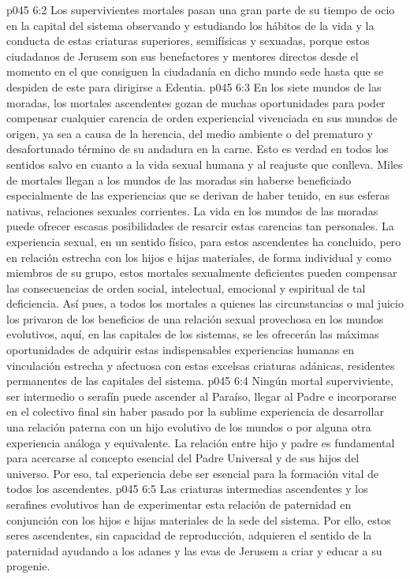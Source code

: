\vs p045 6:2 Los supervivientes mortales pasan una gran parte de su tiempo de ocio en la capital del sistema observando y estudiando los hábitos de la vida y la conducta de estas criaturas superiores, semifísicas y sexuadas, porque estos ciudadanos de Jerusem son sus benefactores y mentores directos desde el momento en el que consiguen la ciudadanía en dicho mundo sede hasta que se despiden de este para dirigirse a Edentia.
\vs p045 6:3 En los siete mundos de las moradas, los mortales ascendentes gozan de muchas oportunidades para poder compensar cualquier carencia de orden experiencial vivenciada en sus mundos de origen, ya sea a causa de la herencia, del medio ambiente o del prematuro y desafortunado término de su andadura en la carne. Esto es verdad en todos los sentidos salvo en cuanto a la vida sexual humana y al reajuste que conlleva. Miles de mortales llegan a los mundos de las moradas sin haberse beneficiado especialmente de las experiencias que se derivan de haber tenido, en sus esferas nativas, relaciones sexuales corrientes. La vida en los mundos de las moradas puede ofrecer escasas posibilidades de resarcir estas carencias tan personales. La experiencia sexual, en un sentido físico, para estos ascendentes ha concluido, pero en relación estrecha con los hijos e hijas materiales, de forma individual y como miembros de su grupo, estos mortales sexualmente deficientes pueden compensar las consecuencias de orden social, intelectual, emocional y espiritual de tal deficiencia. Así pues, a todos los mortales a quienes las circunstancias o mal juicio los privaron de los beneficios de una relación sexual provechosa en los mundos evolutivos, aquí, en las capitales de los sistemas, se les ofrecerán las máximas oportunidades de adquirir estas indispensables experiencias humanas en vinculación estrecha y afectuosa con estas excelsas criaturas adánicas, residentes permanentes de las capitales del sistema.
\vs p045 6:4 \pc Ningún mortal superviviente, ser intermedio o serafín puede ascender al Paraíso, llegar al Padre e incorporarse en el colectivo final sin haber pasado por la sublime experiencia de desarrollar una relación paterna con un hijo evolutivo de los mundos o por alguna otra experiencia análoga y equivalente. La relación entre hijo y padre es fundamental para acercarse al concepto esencial del Padre Universal y de sus hijos del universo. Por eso, tal experiencia debe ser esencial para la formación vital de todos los ascendentes.
\vs p045 6:5 Las criaturas intermedias ascendentes y los serafines evolutivos han de experimentar esta relación de paternidad en conjunción con los hijos e hijas materiales de la sede del sistema. Por ello, estos seres ascendentes, sin capacidad de reproducción, adquieren el sentido de la paternidad ayudando a los adanes y las evas de Jerusem a criar y educar a su progenie.
